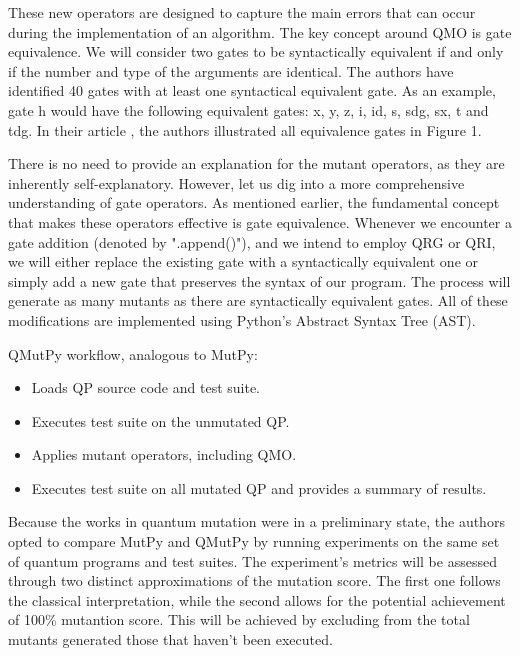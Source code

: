 \begin{itemize}
\vspace{5pt}
These new operators are designed to capture the main errors that can occur during the implementation of an algorithm. The key concept around QMO is gate equivalence. We will consider two gates to be syntactically equivalent if and only if the number and type of the arguments are identical. The authors have identified 40 gates with at least one syntactical equivalent gate. As an example, gate h would have the following equivalent gates: x, y, z, i, id, s, sdg, sx, t and tdg. In their article \cite{fortunato2022mutation}, the authors illustrated all equivalence gates in Figure 1.  \newline

There is no need to provide an explanation for the mutant operators, as they are inherently self-explanatory.  However, let us dig into a more comprehensive understanding of gate operators. As mentioned earlier, the fundamental concept that makes these operators effective is gate equivalence. Whenever we encounter a gate addition (denoted by ".append()"), and we intend to employ QRG or QRI, we will either replace the existing gate with a syntactically equivalent one or simply add a new gate that preserves the syntax of our program. The process will generate as many mutants as there are syntactically equivalent gates. All of these modifications are implemented using Python's Abstract Syntax Tree (AST).\newline

QMutPy workflow, analogous to MutPy:
\begin{itemize}
    \item Loads QP source code and test suite.
    \item Executes test suite on the unmutated QP.
    \item Applies mutant operators, including QMO.
    \item Executes test suite on all mutated QP and provides a summary of results.
\end{itemize}

Because the works in quantum mutation \cite{wang2021qdiff}\cite{mendiluze2021muskit}\cite{ali2021assessing} were in a preliminary state, the authors opted to compare MutPy and QMutPy by running experiments on the same set of quantum programs and test suites. The experiment's metrics will be assessed through two distinct approximations of the mutation score. The first one follows the classical interpretation\cite{jia2010analysis}, while the second allows for the potential achievement of 100\% mutantion score. This will be achieved by excluding from the total mutants generated those that haven't been executed.\newline


\end{itemize}
